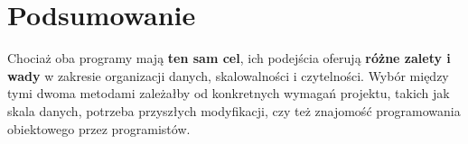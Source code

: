 \documentclass{article}
\begin{document}
\section{Podsumowanie}
Chociaż oba programy mają \textbf{ten sam cel}, ich podejścia oferują \textbf{różne zalety i wady} w zakresie organizacji danych, skalowalności i czytelności. Wybór między tymi dwoma metodami zależałby od konkretnych wymagań projektu, takich jak skala danych, potrzeba przyszłych modyfikacji, czy też znajomość programowania obiektowego przez programistów.
\end{document}
